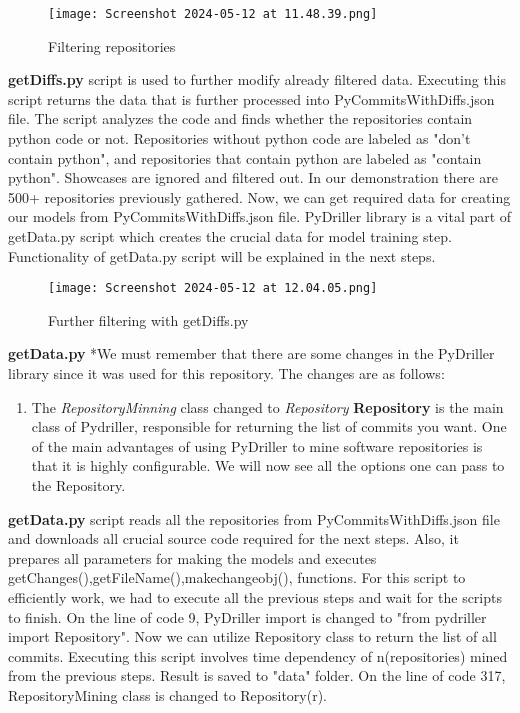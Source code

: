     \begin{figure}
            \centering
            \texttt{[image: Screenshot 2024-05-12 at 11.48.39.png]}
            \caption{Filtering repositories}
            \label{fig:enter-label}
        \end{figure}

    \textbf{getDiffs.py} script is used to further modify already filtered data. Executing this script returns the data that is further processed into PyCommitsWithDiffs.json file. The script analyzes the code and finds whether the repositories contain python code or not. Repositories without python code are labeled as "don't contain python", and repositories that contain python are labeled as "contain python". Showcases are ignored and filtered out. In our demonstration there are 500+ repositories previously gathered. Now, we can get required data for creating our models from PyCommitsWithDiffs.json file. PyDriller library is a vital part of getData.py script which creates the crucial data for model training step. Functionality of getData.py script will be explained in the next steps.
    
    \begin{figure}
        \centering
        \texttt{[image: Screenshot 2024-05-12 at 12.04.05.png]}
        \caption{Further filtering with getDiffs.py}
        \label{fig:enter-label}
    \end{figure}

    \textbf{getData.py}
    *We must remember that there are some changes in the PyDriller library since it was used for this repository. The changes are as follows:
\begin{enumerate}
    \item The \textit{RepositoryMinning} class changed to \textit{Repository} \newline \textbf{Repository} is the main class of Pydriller, responsible for returning the list of commits you want. One of the main advantages of using PyDriller to mine software repositories is that it is highly configurable. We will now see all the options one can pass to the Repository.
\newpage
\end{enumerate}


    \textbf{getData.py} script reads all the repositories from PyCommitsWithDiffs.json file and downloads all crucial source code required for the next steps. Also, it prepares all parameters for making the models and executes getChanges(),getFileName(),makechangeobj(), functions. 
    For this script to efficiently work, we had to execute all the previous steps and wait for the scripts to finish. On the line of code 9, PyDriller import is changed to "from pydriller import Repository". Now we can utilize Repository class to return the list of all commits. Executing this script involves time dependency of n(repositories) mined from the previous steps. Result is saved to "data" folder.
    On the line of code 317, RepositoryMining class is changed to Repository(r).
    
